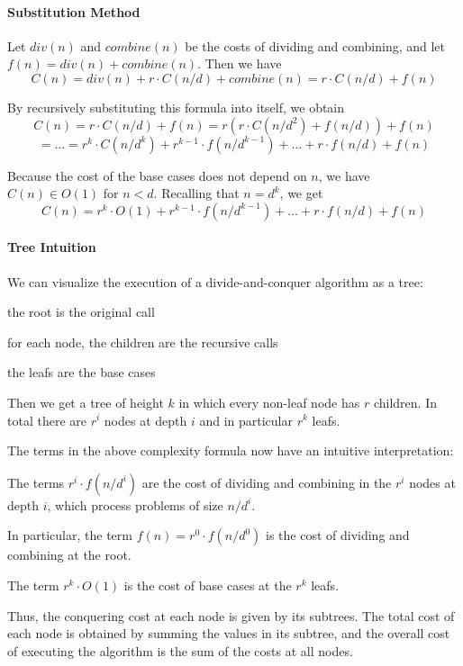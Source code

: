 \paragraph{Substitution Method}
Let $div(n)$ and $combine(n)$ be the costs of dividing and combining, and let $f(n)=div(n)+combine(n)$.
Then we have
 \[C(n)=div(n) + r\cdot C(n/d) + combine(n)=r\cdot C(n/d) + f(n)\]

By recursively substituting this formula into itself, we obtain
 \[C(n)=r\cdot C(n/d) + f(n) = r(r\cdot C(n/d^2) + f(n/d)) + f(n)\]
\[= \ldots = r^k\cdot C(n/d^k) + r^{k-1}\cdot f(n/d^{k-1}) + \ldots + r\cdot f(n/d) + f(n)\]

Because the cost of the base cases does not depend on $n$, we have $C(n)\in O(1)$ for $n<d$.
Recalling that $n=d^k$, we get
\[C(n)=r^k\cdot O(1) + r^{k-1}\cdot f(n/d^{k-1}) + \ldots + r\cdot f(n/d) + f(n)\]

\paragraph{Tree Intuition}
We can visualize the execution of a divide-and-conquer algorithm as a tree:
\begin{compactitem}
 \item the root is the original call
 \item for each node, the children are the recursive calls
 \item the leafs are the base cases
\end{compactitem}
Then we get a tree of height $k$ in which every non-leaf node has $r$ children.
In total there are $r^i$ nodes at depth $i$ and in particular $r^k$ leafs.

The terms in the above complexity formula now have an intuitive interpretation:
\begin{compactitem}
\item The terms $r^i\cdot f(n/d^i)$ are the cost of dividing and combining in the $r^i$ nodes at depth $i$, which process problems of size $n/d^i$.
\item In particular, the term $f(n)=r^0\cdot f(n/d^0)$ is the cost of dividing and combining at the root.
\item The term $r^k\cdot O(1)$ is the cost of base cases at the $r^k$ leafs.
\end{compactitem}
Thus, the conquering cost at each node is given by its subtrees.
The total cost of each node is obtained by summing the values in its subtree, and the overall cost of executing the algorithm is the sum of the costs at all nodes.

